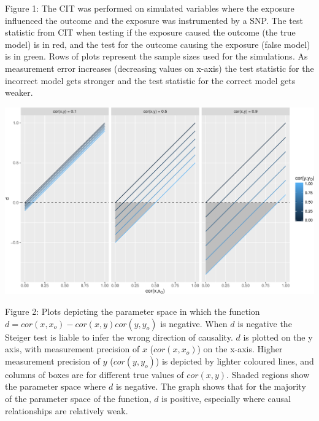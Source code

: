 \documentclass[]{article}
\begin{document}
Figure 1: The CIT was performed on simulated variables where the
exposure influenced the outcome and the exposure was instrumented by a
SNP. The test statistic from CIT when testing if the exposure caused the
outcome (the true model) is in red, and the test for the outcome causing
the exposure (false model) is in green. Rows of plots represent the
sample sizes used for the simulations. As measurement error increases
(decreasing values on x-axis) the test statistic for the incorrect model
gets stronger and the test statistic for the correct model gets weaker.

\newpage

\includegraphics{manuscript_files/figure-latex/d_relationship_figure-1.pdf}

Figure 2: Plots depicting the parameter space in which the function
\(d = cor(x, x_o) - cor(x,y)cor(y, y_o)\) is negative. When \(d\) is
negative the Steiger test is liable to infer the wrong direction of
causality. \(d\) is plotted on the y axis, with measurement precision of
\(x\) (\(cor(x,x_o)\)) on the x-axis. Higher measurement precision of
\(y\) (\(cor(y,y_o)\)) is depicted by lighter coloured lines, and
columns of boxes are for different true values of \(cor(x,y)\). Shaded
regions show the parameter space where \(d\) is negative. The graph
shows that for the majority of the parameter space of the function,
\(d\) is positive, especially where causal relationships are relatively
weak.

\newpage
\end{document}
